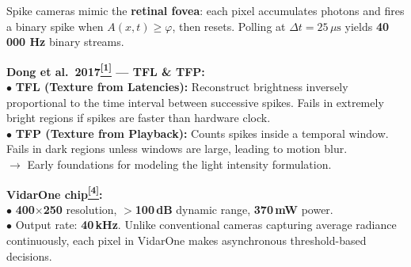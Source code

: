 \documentclass[final]{beamer}
\newcommand{\paper}[1]{\hyperlink{ref:#1}{\textcolor{TealAccent}{\textsuperscript{\textbf{[#1]}}}}}
\newcommand{\metric}[1]{\textcolor{AccentOrange}{\textbf{#1}}}
\newlength{\CW}\setlength{\CW}{38.0cm}    %
\newlength{\FW}\setlength{\FW}{119.0cm}   %
\begin{document}
\begin{frame}[t]{}
\begin{tikzpicture}[font=\small]
\end{tikzpicture}

\vspace{0.12cm}

\hspace{0.5cm}%
%
\begin{columns}[T,totalwidth=\FW]

\begin{column}{\CW}

\begin{tcolorbox}[pbox=SensorCol,
  title={Sensor Principles — Integrate-and-Fire Model\paper{1}\paper{4}}]
\normalsize
Spike cameras mimic the \textbf{retinal fovea}: each pixel accumulates photons
and fires a binary spike when $A(x,t)\!\ge\!\varphi$, then resets.
Polling at $\Delta t=25\,\mu\mathrm{s}$ yields \metric{40\,000 Hz} binary streams.

\medskip
\textbf{Dong et al.\ 2017\paper{1} — TFL \& TFP:}\\
$\bullet$ \textbf{TFL (Texture from Latencies):} Reconstruct brightness inversely proportional to the time interval between successive spikes. Fails in extremely bright regions if spikes are faster than hardware clock.\\
$\bullet$ \textbf{TFP (Texture from Playback):} Counts spikes inside a temporal window. Fails in dark regions unless windows are large, leading to motion blur.\\
$\rightarrow$ Early foundations for modeling the light intensity formulation.

\medskip
\textbf{VidarOne chip\paper{4}:}\\
$\bullet$ \metric{400$\times$250} resolution, \metric{$>$100\,dB} dynamic range, \metric{370\,mW} power.\\
$\bullet$ Output rate: \metric{40\,kHz}. Unlike conventional cameras capturing average radiance continuously, each pixel in VidarOne makes asynchronous threshold-based decisions.
\end{tcolorbox}


\end{column}
\end{columns}
\end{frame}
\end{document}
